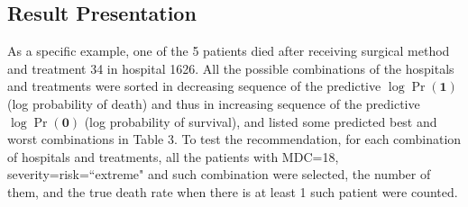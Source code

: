 \documentclass{article}
\begin{document}
\subsection{Result Presentation}
\indent
As a specific example, one of the 5 patients died after receiving surgical method and treatment 34 in hospital 1626. All the possible combinations of the hospitals and treatments were sorted in decreasing sequence of the predictive 
$\log \Pr(\textbf{1})$ (log probability of death) and thus in increasing sequence of the predictive $\log \Pr(\textbf{0})$ (log probability of survival), and listed some predicted best and worst combinations in Table 3. To test the recommendation, for each combination of hospitals and treatments, all the patients with MDC=18, severity=risk=``extreme" and such combination were selected, the number of them, and the true death rate when there is at least 1 such patient were counted. \\
\end{document}
